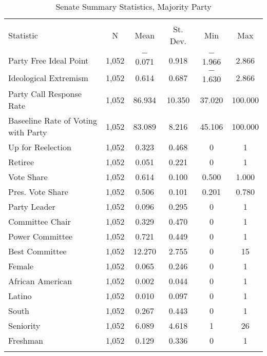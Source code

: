 \documentclass[12pt]{article}
\begin{document}
\begin{table}[H] 
	\centering 
	\singlespacing
	\caption{Senate Summary Statistics, Majority Party} 
	\label{} 
	\begin{tabular}{@{\extracolsep{5pt}}lccccc} 
		\\[-1.8ex]\hline 
		\hline \\[-1.8ex] 
		Statistic & \multicolumn{1}{c}{N} & \multicolumn{1}{c}{Mean} & \multicolumn{1}{c}{St. Dev.} & \multicolumn{1}{c}{Min} & \multicolumn{1}{c}{Max} \\ 
		\hline \\[-1.8ex] 
		Party Free Ideal Point & 1,052 & $-$0.071 & 0.918 & $-$1.966 & 2.866 \\ 
		Ideological Extremism & 1,052 & 0.614 & 0.687 & $-$1.630 & 2.866 \\ 
		Party Call Response Rate & 1,052 & 86.934 & 10.350 & 37.020 & 100.000 \\ 
		Baseeline Rate of Voting with Party & 1,052 & 83.089 & 8.216 & 45.106 & 100.000 \\ 
		
		Up for Reelection & 1,052 & 0.323 & 0.468 & 0 & 1 \\ 
		Retiree & 1,052 & 0.051 & 0.221 & 0 & 1 \\ 
		Vote Share & 1,052 & 0.614 & 0.100 & 0.500 & 1.000 \\ 
		Pres. Vote Share & 1,052 & 0.506 & 0.101 & 0.201 & 0.780 \\ 
		Party Leader & 1,052 & 0.096 & 0.295 & 0 & 1 \\ 
		Committee Chair & 1,052 & 0.329 & 0.470 & 0 & 1 \\ 
		Power Committee & 1,052 & 0.721 & 0.449 & 0 & 1 \\ 
		Best Committee & 1,052 & 12.270 & 2.755 & 0 & 15 \\ 
		Female & 1,052 & 0.065 & 0.246 & 0 & 1 \\ 
		African American & 1,052 & 0.002 & 0.044 & 0 & 1 \\ 
		Latino & 1,052 & 0.010 & 0.097 & 0 & 1 \\ 
		South & 1,052 & 0.267 & 0.443 & 0 & 1 \\ 
		Seniority & 1,052 & 6.089 & 4.618 & 1 & 26 \\ 
		Freshman & 1,052 & 0.129 & 0.336 & 0 & 1 \\ 
		
		\hline \\[-1.8ex] 
	\end{tabular} 
\end{table} 
\end{document}
